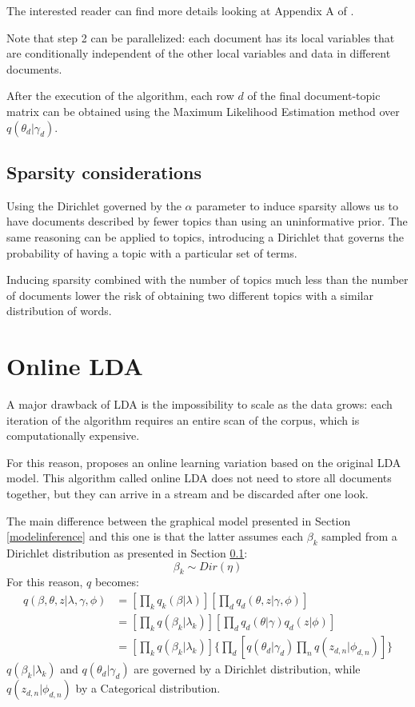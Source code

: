 The interested reader can find more details looking at Appendix A of \cite{DBLP:journals/jmlr/BleiNJ03}.

Note that step 2 can be parallelized: each document has its local variables that are conditionally independent
of the other local variables and data in different documents.

After the execution of the algorithm, each row $d$ of the final document-topic matrix can be obtained using the Maximum Likelihood Estimation method over $q(\theta_d | \gamma_d)$.

\subsection{Sparsity considerations} \label{sparsity_lda}
Using the Dirichlet governed by the $\alpha$ parameter to induce sparsity
allows us to have documents described by fewer topics than using an uninformative prior.
The same reasoning can be applied to topics, introducing a Dirichlet that governs the
probability of having a topic with a particular set of terms.

Inducing sparsity combined with the number of topics much less than the number of documents
lower the risk of obtaining two different topics with a similar distribution of words.


\section{Online LDA}
A major drawback of LDA is the impossibility to scale as the data grows:
each iteration of the algorithm requires an entire scan of the corpus, which is computationally expensive.

For this reason, \cite{NIPS2010_3902} proposes an online learning variation based on the original LDA model.
This algorithm called online LDA does not need to store all documents together,
but they can arrive in a stream and be discarded after one look.

The main difference between the graphical model presented in Section \ref{modelinference} and this one
is that the latter assumes each $\beta_k$ sampled from a Dirichlet distribution as presented in Section \ref{sparsity_lda}:
\begin{equation}
    \beta_k \sim Dir(\eta)
\end{equation}
For this reason, $q$ becomes:
\begin{equation*}
    \begin{split}
        q(\beta, \theta, z| \lambda, \gamma, \phi) & = [\prod_k q_k(\beta | \lambda)] [\prod_d q_d(\theta, z | \gamma, \phi)] \\
        & = [\prod_k q(\beta_k | \lambda_k)] [\prod_d q_d(\theta | \gamma) q_d(z | \phi)] \\
        & = [\prod_k q(\beta_k | \lambda_k)] \{\prod_d [q(\theta_d | \gamma_d) \prod_n q(z_{d,n} | \phi_{d,n})]\}
    \end{split}
\end{equation*}
$q(\beta_k | \lambda_k)$ and $q(\theta_d | \gamma_d)$ are governed by a Dirichlet distribution, while $q(z_{d,n} | \phi_{d,n})$ by a Categorical distribution.


